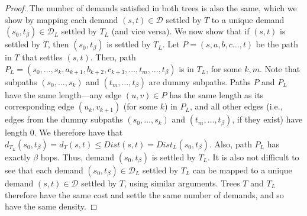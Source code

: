 \documentclass{article}
\theoremstyle{definition}
\theoremstyle{remark}
\begin{document}
\begin{proof}
    The number of demands satisfied in both trees is also the same, which we show by mapping each demand $(s,t) \in \mathcal{D}$ settled by $T$ to a unique demand $(s_0, t_\beta) \in \mathcal{D}_L$ settled by $T_L$ (and vice versa). We now show that if $(s,t)$ is settled by $T$, then $(s_0, t_\beta)$ is settled by $T_L$. Let $P = (s, a, b, c \dots, t)$ be the path in $T$ that settles $(s,t)$. Then, path $P_L = (s_0, \dots, s_k, a_{k+1}, b_{k+2}, c_{k+3}, \dots, t_{m}, \dots , t_\beta )$ is in $T_L$, for some $k, m$. Note that subpaths $(s_0, \dots, s_k )$ and $(t_{m}, \dots , t_\beta )$ are dummy subpaths.
    Paths $P$ and $P_L$ have the same length---any edge $(u,v) \in P$ has the same length as its corresponding edge $(u_k, v_{k+1})$ (for some $k$) in $P_L$, and all other edges (i.e., edges from the dummy subpaths $(s_0, \dots, s_k)$ and $(t_m, \dots, t_\beta)$, if they exist) have length $0$. We therefore have that $d_{T_L}(s_0,t_\beta) = d_T(s,t) \leq  Dist(s,t) = Dist_L(s_0,t_\beta)$. Also, path $P_L$ has exactly $\beta$ hops. Thus, demand $(s_0, t_\beta)$ is settled by $T_L$. It is also not difficult to see that each demand $(s_0, t_\beta) \in \mathcal{D}_L$ settled by $T_L$ can be mapped to a unique demand $(s,t) \in \mathcal{D}$ settled by $T$, using similar arguments. Trees $T$ and $T_L$ therefore have the same cost and settle the same number of demands, and so have the same density. 
\end{proof}
\end{document}
